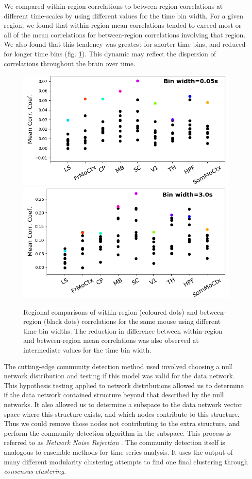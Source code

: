 \documentclass[a4paper,12pt]{article}
\theoremstyle{definition}
\begin{document}
We compared within-region correlations to between-region correlations at different time-scales by using different values for the time bin width. For a given region, we found that within-region mean correlations tended to exceed most or all of the mean correlations for between-region correlations involving that region. We also found that this tendency was greatest for shorter time bins, and reduced for longer time bins (fig. \ref{fig:within_between}). This dynamic may reflect the dispersion of correlations throughout the brain over time.

\begin{figure}[t!]
    \centering
    \includegraphics[width=0.45\columnwidth]{images/Krebs_0p05_corr_comp.png}
    \includegraphics[width=0.45\columnwidth]{images/Krebs_3p0_corr_comp.png}
    \vspace{-0.4cm}
    \caption{Regional comparisons of within-region (coloured dots) and between-region (black dots) correlations for the same mouse using different time bin widths. The reduction in difference between within-region and between-region mean correlations was also observed at intermediate values for the time bin width.}
    \vspace{-0.4cm}
    \label{fig:within_between}
\end{figure}


The cutting-edge community detection method used involved choosing a null network distribution and testing if this model was valid for the data network. This hypothesis testing applied to network distributions allowed us to determine if the data network contained structure beyond that described by the null networks. It also allowed us to determine a subspace to the data network vector space where this structure exists, and which nodes contribute to this structure. Thus we could remove those nodes not contributing to the extra structure, and perform the community detection algorithm in the subspace. This process is referred to as \textit{Network Noise Rejection} \cite{humphries}. The community detection itself is analogous to ensemble methods for time-series analysis. It uses the output of many different modularity clustering attempts to find one final clustering through \textit{consensus-clustering}.
\end{document}
